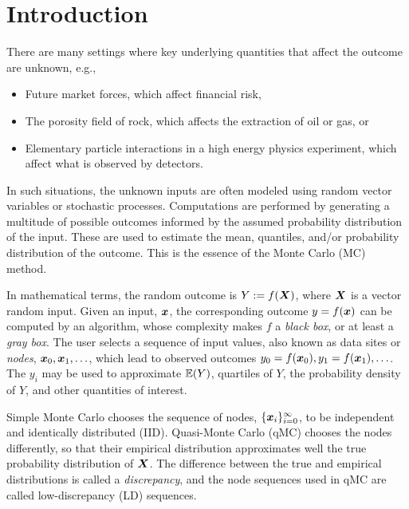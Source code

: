 \documentclass{svproc}
\newcounter{algorithm}%
\begin{document}
\section{Introduction} \label{sec:intro}
There are many settings where key underlying quantities that affect the outcome are unknown, e.g.,
\begin{itemize}
	\item Future market forces, which affect financial risk,
	\item The porosity field of rock, which affects the extraction of oil or gas, or
	\item Elementary particle interactions in a high energy physics experiment, which affect what is observed by detectors.
\end{itemize}
In such situations, the unknown inputs are often modeled using random vector variables or stochastic processes.  Computations are performed by generating a multitude of possible outcomes informed by the assumed probability distribution of the input. These are used to estimate the mean, quantiles, and/or probability distribution of the outcome.  This is the essence of the Monte Carlo (MC) method.

In mathematical terms, the random outcome is $Y := f({\boldsymbol{X}})$, where ${\boldsymbol{X}}$ is a vector random input.  Given an input, ${\boldsymbol{x}}$, the corresponding outcome  $y = f({\boldsymbol{x}})$ can be computed by an algorithm, whose complexity makes $f$ a \emph{black box}, or at least a \emph{gray box}.  The user selects a sequence of input values, also known as data sites or \emph{nodes}, ${\boldsymbol{x}}_0, {\boldsymbol{x}}_1, \ldots$, which lead to observed outcomes $y_0 = f({\boldsymbol{x}}_0), y_1 = f({\boldsymbol{x}}_1), \ldots$.  The $y_i$ may be used to approximate ${\mathbb{E}}(Y)$, quartiles of $Y$, the probability density of $Y$, and other quantities of interest.

Simple  Monte Carlo chooses the sequence of nodes, $\{{\boldsymbol{x}}_i\}_{i=0}^\infty$, to be independent and identically distributed (IID).  Quasi-Monte Carlo (qMC)  chooses the nodes differently, so that their empirical distribution approximates well the true probability distribution of ${\boldsymbol{X}}$.  The difference between  the true and empirical distributions is called a \emph{discrepancy}, and the node sequences used in qMC are called low-discrepancy (LD) sequences.
\end{document}
